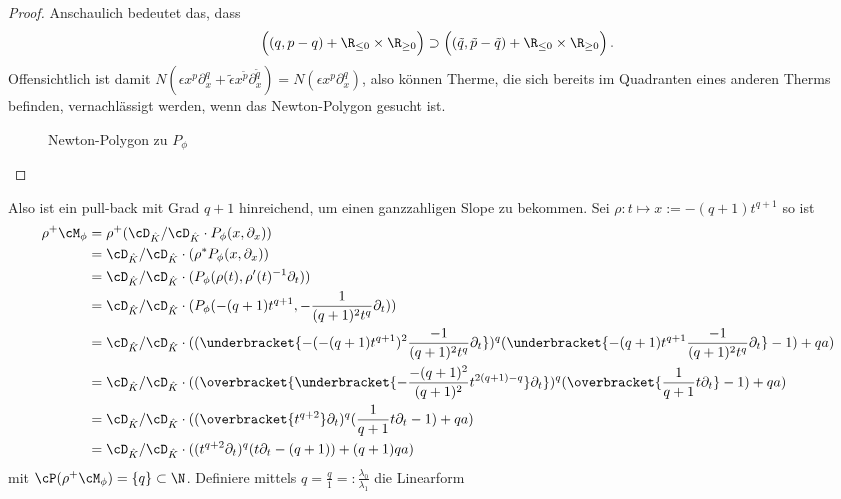 \begin{proof}
Anschaulich bedeutet das, dass
\[
\Big( (q,p-q) + \R_{\leq 0} \times \R_{\geq 0} \Big) \supset
\Big( (\tilde q,\tilde p-\tilde q) + \R_{\leq 0} \times \R_{\geq 0} \Big) \,.
\]
Offensichtlich ist damit $ N(\epsilon x^{p}\partial_x^{q}+\tilde\epsilon
x^{\tilde p}\partial_x^{\tilde q}) =N(\epsilon x^{p}\partial_x^{q}) $, also
können Therme, die sich bereits im Quadranten eines anderen Therms befinden,
vernachlässigt werden, wenn das Newton-Polygon gesucht ist.
\begin{figure}[H] %
\begin{center}
\end{center}
\caption{Newton-Polygon zu $P_{\phi}$}
\end{figure}
\end{proof}
Also ist ein pull-back mit Grad $q+1$ hinreichend, um einen ganzzahligen Slope
zu bekommen.
Sei $\rho:t\mapsto x:=-(q+1) t^{q+1}$ so ist
\begin{align*}
\rho^+\cM_\phi &= \rho^+(\cD_{\hat K}/\cD_{\hat K}\cdot P_\phi(x,\partial_x))\\
  &=\cD_{\hat K}/\cD_{\hat K}\cdot(\rho^*P_\phi(x,\partial_x))\\
  &=\cD_{\hat K}/\cD_{\hat K}\cdot(P_\phi(\rho(t),\rho'(t)^{-1}\partial_t))\\
  &=\cD_{\hat K}/\cD_{\hat K}
    \cdot(P_\phi(-(q+1) t^{q+1},-\frac{1}{(q+1)^2t^q}\partial_t))\\
  &=\cD_{\hat K}/\cD_{\hat K} \cdot
    ((\underbracket{-(-(q+1) t^{q+1})^2\frac{-1}{(q+1)^2t^{q}}\partial_t})^{q}
    (\underbracket{-(q+1) t^{q+1}\frac{-1}{(q+1)^2t^{q}}\partial_t}-1)+qa)\\
  &=\cD_{\hat K}/\cD_{\hat K}
    \cdot((\overbracket{
      \underbracket{-\frac{-(q+1)^2}{(q+1)^2}t^{2(q+1)-q}}\partial_t})^{q}
    (\overbracket{\frac{1}{q+1}t\partial_t}-1)+qa)\\
  &=\cD_{\hat K}/\cD_{\hat K}
    \cdot((\overbracket{t^{q+2}}\partial_t)^{q}
    (\frac{1}{q+1}t\partial_t-1)+qa)\\
  &=\cD_{\hat K}/\cD_{\hat K}
    \cdot((t^{q+2}\partial_t)^{q}
    (t\partial_t-(q+1))+(q+1)qa)
\end{align*}
mit $\cP(\rho^+\cM_\phi)=\{q\}\subset\N$. Definiere mittels
$q=\frac{q}{1}=:\frac{\lambda_0}{\lambda_1}$ die  Linearform
